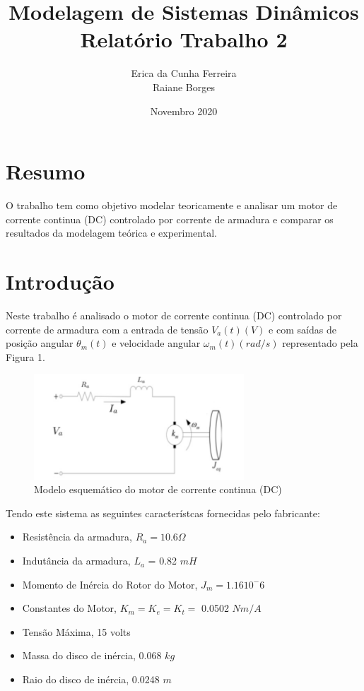 \documentclass[12pt]{article}
\title{%
    Modelagem de Sistemas Dinâmicos\\ %
    \large Relatório Trabalho 2}
\author{Erica da Cunha Ferreira \\Raiane Borges}
\date{Novembro 2020}
\begin{document}
\maketitle

\newpage
\tableofcontents

\newpage
\section{Resumo} %
\quad O trabalho tem como objetivo modelar teoricamente e analisar um motor de corrente continua (DC) controlado por corrente de armadura e  comparar os resultados da modelagem teórica e experimental.

\section{Introdução}

\quad  Neste trabalho é analisado o motor de corrente continua (DC) controlado por corrente de armadura com a entrada de tensão $V_a (t)(V)$ e com saídas de posição angular $\theta_m (t)$ e velocidade angular $\omega_m (t)(rad/s)$ representado pela Figura 1.

\begin{figure}[h] %
    \centering
    \includegraphics[width = 0.7\textwidth]{Sistema.jpg}
    \caption{Modelo esquemático do motor de corrente continua (DC)}
    \label{fig:mesh1}
\end{figure}

\quad Tendo este sistema as seguintes característcas fornecidas pelo fabricante:

\begin{itemize}
    \item Resistência da armadura, $R_a = 10.6 \Omega$
    \item Indutância da armadura, $L_a$ = 0.82 $mH$
    \item Momento de Inércia do Rotor do Motor, $J_m = 1.16 10^-6$ 
    \item Constantes do Motor, $K_m = K_e = K_t =$ 0.0502 $Nm/A$
    \item Tensão Máxima, 15 volts
    \item Massa do disco de inércia, 0.068 $kg$
    \item Raio do disco de inércia, 0.0248 $m$
\end{itemize}
\end{document}
